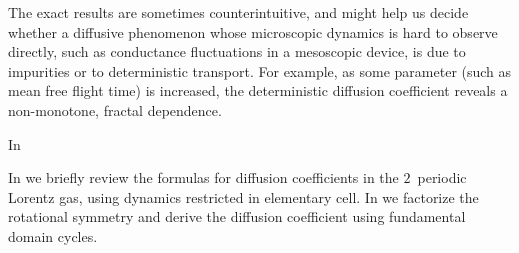 The exact results are sometimes counterintuitive, and might help us
decide whether a diffusive phenomenon whose microscopic dynamics is hard
to observe directly, such as conductance fluctuations in a mesoscopic
device, is due to impurities or to deterministic transport. For example,
as some parameter (such as mean free flight time) is increased, the
deterministic diffusion coefficient reveals a non-monotone, fractal
dependence.

In 

In 
we briefly review the formulas for diffusion
coefficients in the $2$\dmn\ periodic Lorentz gas, using dynamics
restricted in elementary cell.
In  we
factorize the rotational symmetry and derive the diffusion coefficient
using fundamental domain cycles.
